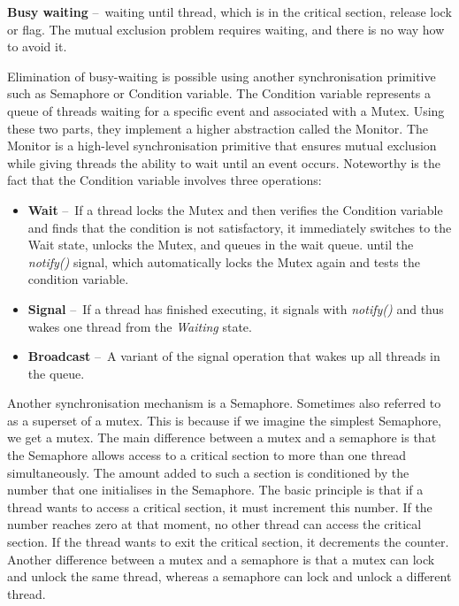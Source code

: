 \begin{definition}
    \textbf{Busy waiting} \---\ waiting until thread, which is in the critical section, release lock or flag.
    The mutual exclusion problem requires waiting, and there is no way how to avoid it.
\end{definition}
Elimination of busy-waiting is possible using another synchronisation primitive such as Semaphore or Condition variable.
The Condition variable represents a queue of threads waiting for a specific event and associated with a Mutex.
Using these two parts, they implement a higher abstraction called the Monitor.
The Monitor is a high-level synchronisation primitive that ensures mutual exclusion while giving threads the ability to wait until an event occurs.
Noteworthy is the fact that the Condition variable involves three operations:
\begin{itemize}[itemsep=1mm, parsep=0pt]
    \item \textbf {Wait} \---\ If a thread locks the Mutex and then verifies the Condition variable and finds that the condition is not satisfactory, it immediately switches to the Wait state, unlocks the Mutex, and queues in the wait queue.
    until the \emph{notify()} signal, which automatically locks the Mutex again and tests the condition variable.
    \item \textbf{Signal} \---\ If a thread has finished executing, it signals with \emph{notify()} and thus wakes one thread from the \emph{Waiting} state.
    \item \textbf{Broadcast} \---\ A variant of the signal operation that wakes up all threads in the queue.
\end{itemize}
Another synchronisation mechanism is a Semaphore.
Sometimes also referred to as a superset of a mutex.
This is because if we imagine the simplest Semaphore, we get a mutex.
The main difference between a mutex and a semaphore is that the Semaphore allows access to a critical section to more than one thread simultaneously.
The amount added to such a section is conditioned by the number that one initialises in the Semaphore.
The basic principle is that if a thread wants to access a critical section, it must increment this number.
If the number reaches zero at that moment, no other thread can access the critical section.
If the thread wants to exit the critical section, it decrements the counter.
Another difference between a mutex and a semaphore is that a mutex can lock and unlock the same thread, whereas a semaphore can lock and unlock a different thread.


